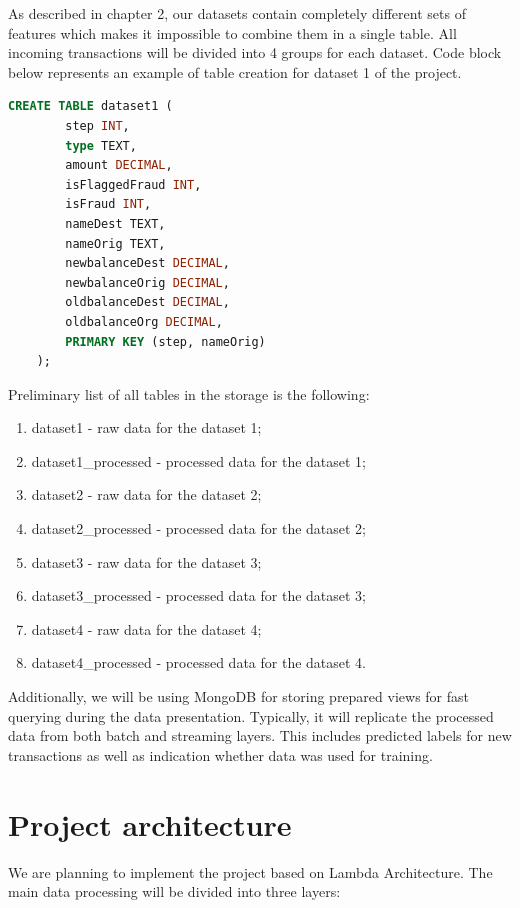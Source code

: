 \documentclass[12pt,a4paper, hidelinks]{article}
\begin{document}
As described in chapter 2, our datasets contain completely different sets of features which makes it impossible to combine them in a single table. All incoming transactions will be divided into 4 groups for each dataset. Code block below represents an example of table creation for dataset 1 of the project.


\begin{lstlisting}[language=SQL, caption=Apache Cassandra table creation]
    CREATE TABLE dataset1 (
        step INT,
        type TEXT,
        amount DECIMAL,
        isFlaggedFraud INT,
        isFraud INT,
        nameDest TEXT,
        nameOrig TEXT,
        newbalanceDest DECIMAL,
        newbalanceOrig DECIMAL,
        oldbalanceDest DECIMAL,
        oldbalanceOrg DECIMAL,
        PRIMARY KEY (step, nameOrig)
    );
\end{lstlisting}

Preliminary list of all tables in the storage is the following:

\begin{enumerate}
    \item dataset1 - raw data for the dataset 1;
    \item dataset1\_processed - processed data for the dataset 1;
    \item dataset2 - raw data for the dataset 2;
    \item dataset2\_processed - processed data for the dataset 2;
    \item dataset3 - raw data for the dataset 3;
    \item dataset3\_processed - processed data for the dataset 3;
    \item dataset4 - raw data for the dataset 4;
    \item dataset4\_processed - processed data for the dataset 4.
\end{enumerate}

Additionally, we will be using MongoDB for storing prepared views for fast querying during the data presentation. Typically, it will replicate the processed data from both batch and streaming layers. This includes predicted labels for new transactions as well as indication whether data was used for training.


\section{Project architecture}

We are planning to implement the project based on Lambda Architecture. The main data processing will be divided into three layers:
\end{document}
